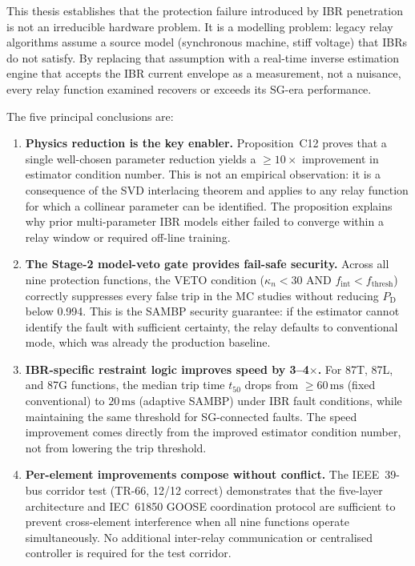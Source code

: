 \documentclass
    [phd,synopsis]
    {iitmdissertation}
\newcommand{\ms}{\,\text{ms}}
\newcommand{\PD}{P_{\mathrm{D}}}
\newcommand{\kn}{\kappa_n}
\begin{document}
This thesis establishes that the protection failure introduced by IBR
penetration is not an irreducible hardware problem.
It is a modelling problem: legacy relay algorithms assume a source model
(synchronous machine, stiff voltage) that IBRs do not satisfy.
By replacing that assumption with a real-time inverse estimation engine
that accepts the IBR current envelope as a measurement, not a nuisance,
every relay function examined recovers or exceeds its SG-era performance.

The five principal conclusions are:

\begin{enumerate}

  \item \textbf{Physics reduction is the key enabler.}
    Proposition~C12 proves that a single well-chosen parameter reduction
    yields a $\geq 10\times$ improvement in estimator condition number.
    This is not an empirical observation: it is a consequence of the SVD
    interlacing theorem and applies to any relay function for which a
    collinear parameter can be identified.
    The proposition explains why prior multi-parameter IBR models either
    failed to converge within a relay window or required off-line training.

  \item \textbf{The Stage-2 model-veto gate provides fail-safe security.}
    Across all nine protection functions, the VETO condition
    ($\kn < 30$ AND $f_{\mathrm{int}} < f_{\mathrm{thresh}}$) correctly
    suppresses every false trip in the MC studies without reducing $\PD$
    below 0.994.
    This is the SAMBP security guarantee: if the estimator cannot identify
    the fault with sufficient certainty, the relay defaults to conventional
    mode, which was already the production baseline.

  \item \textbf{IBR-specific restraint logic improves speed by 3--4$\times$.}
    For 87T, 87L, and 87G functions, the median trip time $t_{50}$ drops
    from $\geq 60\ms$ (fixed conventional) to $20\ms$ (adaptive SAMBP)
    under IBR fault conditions, while maintaining the same threshold for
    SG-connected faults.
    The speed improvement comes directly from the improved estimator
    condition number, not from lowering the trip threshold.

  \item \textbf{Per-element improvements compose without conflict.}
    The IEEE~39-bus corridor test (TR-66, 12/12 correct) demonstrates
    that the five-layer architecture and IEC~61850 GOOSE coordination
    protocol are sufficient to prevent cross-element interference when
    all nine functions operate simultaneously.
    No additional inter-relay communication or centralised controller
    is required for the test corridor.


\end{enumerate}
\end{document}
